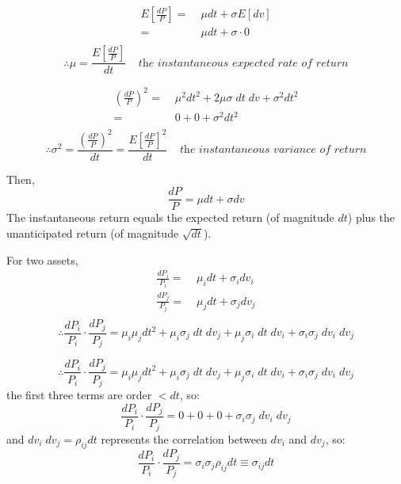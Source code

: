 \documentclass[
14pt,notheorems,hyperref={pdfauthor=whatever}
]{beamer}
\begin{document}
\begin{frame}
\begin{align*}
    E[\frac{dP}{P}] =&\; \mu dt + \sigma E[dv]\\
    =&\; \mu dt + \sigma \cdot 0\\
\end{align*}
\[\therefore \mu = \frac{E[\frac{dP}{P}]}{dt} \;\;\;\; \textit{the instantaneous expected rate of return}\]
\end{frame}

\begin{frame}
\begin{align*}
    (\frac{dP}{P})^2 =&\; \mu^2 dt^2 + 2\mu\sigma \; dt \; dv + \sigma^2 dt^2\\
    =&\; 0 + 0 + \sigma^2 dt^2\\
\end{align*}
\[\therefore \sigma^2 = \frac{(\frac{dP}{P})^2}{dt} = \frac{E[\frac{dP}{P}]^2}{dt} \;\;\;\; \textit{the instantaneous variance of return}\]
\end{frame}

\begin{frame}
Then,\\
\[\frac{dP}{P} = \mu dt + \sigma dv\]
The instantaneous return equals the expected return (of magnitude $dt$) plus the unanticipated return (of magnitude $\sqrt{dt}$).
\end{frame}

\begin{frame}
For two assets,\\
\begin{align*}
    \frac{dP_i}{P_i} =&\; \mu_i dt + \sigma_i dv_i\\
    \frac{dP_j}{P_j} =&\; \mu_j dt + \sigma_j dv_j\\
\end{align*}
\[\therefore \frac{dP_i}{P_i}\cdot\frac{dP_j}{P_j} = \mu_i\mu_j dt^2 + \mu_i\sigma_j\;dt\;dv_j + \mu_j\sigma_i\;dt\;dv_i + \sigma_i\sigma_j\;dv_i\;dv_j\]
\end{frame}

\begin{frame}
\[\therefore \frac{dP_i}{P_i}\cdot\frac{dP_j}{P_j} = \mu_i\mu_j dt^2 + \mu_i\sigma_j\;dt\;dv_j + \mu_j\sigma_i\;dt\;dv_i + \sigma_i\sigma_j\;dv_i\;dv_j\]
the first three terms are order $< dt$, so:
\[\frac{dP_i}{P_i}\cdot\frac{dP_j}{P_j} = 0 + 0 + 0 + \sigma_i\sigma_j\;dv_i\;dv_j\]
and $dv_i\;dv_j=\rho_{ij}dt$ represents the correlation between $dv_i$ and $dv_j$, so:
\[\frac{dP_i}{P_i}\cdot\frac{dP_j}{P_j} = \sigma_i\sigma_j\rho_{ij}dt \equiv \sigma_{ij} dt\]
\end{frame}
\end{document}
